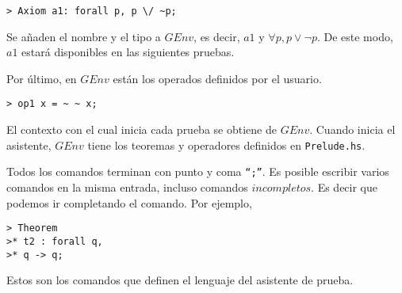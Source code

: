 \documentclass[a4paper,11pt]{article}
\theoremstyle{definition}
\begin{document}
\begin{verbatim}
> Axiom a1: forall p, p \/ ~p;
\end{verbatim}

Se añaden el nombre y el tipo a $GEnv$, es decir, $a1$ y $\forall p, p \vee \neg p$.
De este modo, $a1$ estará disponibles en las siguientes pruebas.

Por último, en $GEnv$ están los operados definidos por el usuario.

\begin{verbatim}
> op1 x = ~ ~ x;
\end{verbatim}

El contexto con el cual inicia cada prueba se obtiene de $GEnv$. Cuando inicia el asistente, $GEnv$ tiene los teoremas
y operadores definidos en \texttt{Prelude.hs}.

Todos los comandos terminan con punto y coma \texttt{``;''}. Es posible escribir varios comandos en la misma entrada,
incluso comandos $incompletos$. Es decir que podemos ir completando el comando. 
Por ejemplo,

\begin{verbatim}
> Theorem 
>* t2 : forall q,
>* q -> q;
\end{verbatim}

Estos son los comandos que definen el lenguaje del asistente de prueba.
\end{document}

